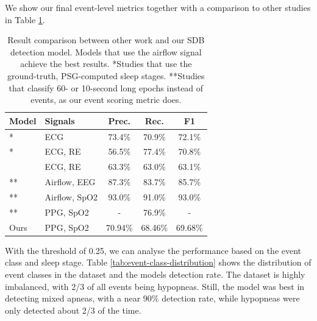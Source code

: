 We show our final event-level metrics together with a comparison to other studies in Table \ref{tab:final-metrics}.

\renewcommand{\arraystretch}{1.5}
\begin{table}
    \centering
    \begin{tabular}{ l l c c c }
        Model & Signals & Prec. & Rec. & F1\\
        \hline
        \cite{olsen2020robust}* & ECG & 73.4\% & 70.9\% & 72.1\% \\
        \cite{xie2023use}* & ECG, RE & 56.5\% & 77.4\% & 70.8\% \\
        \cite{xie2024multi} & ECG, RE & 63.3\% & 63.0\% & 63.1\% \\
        \cite{li2023deep}** & Airflow, EEG & 87.3\% & 83.7\% & 85.7\% \\
        \cite{yook2024deep}** & Airflow, SpO2 & 93.0\% & 91.0\% & 93.0\% \\
        \cite{lazazzera2020detection}** & PPG, SpO2 & - & 76.9\% & - \\
        Ours & PPG, SpO2 & 70.94\% & 68.46\% & 69.68\% \\
    \end{tabular}
    \caption{Result comparison between other work and our SDB detection model. Models that use the airflow signal achieve the best results. *Studies that use the ground-truth, PSG-computed sleep stages. **Studies that classify 60- or 10-second long epochs instead of events, as our event scoring metric does. \label{tab:final-metrics}}
\end{table}

With the threshold of 0.25, we can analyse the performance based on the event class and sleep stage. Table \ref{tab:event-class-distribution} shows the distribution of event classes in the dataset and the models detection rate. The dataset is highly imbalanced, with 2/3 of all events being hypopneas. Still, the model was best in detecting mixed apneas, with a near 90\% detection rate, while hypopneas were only detected about 2/3 of the time.

